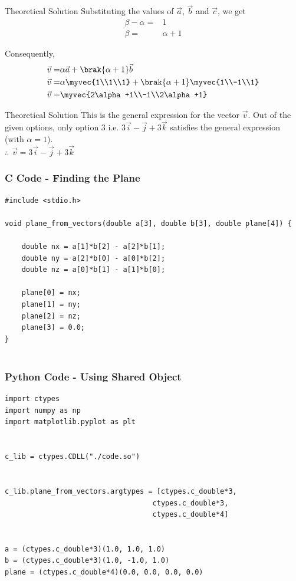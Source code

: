 \documentclass{beamer}
\begin{document}
\begin{frame}{Theoretical Solution}
Substituting the values of $\vec{a}$, $\vec{b}$ and $\vec{c}$, we get
\begin{align}
    \beta-\alpha =& 1\\
    \beta =& \alpha + 1
\end{align}

Consequently,
\begin{align}
    \vec{v} =& \alpha\vec{a} + \brak{\alpha + 1}\vec{b}\\
    \vec{v} =& \alpha\myvec{1\\1\\1} + \brak{\alpha + 1}\myvec{1\\-1\\1}\\
    \vec{v} =& \myvec{2\alpha+1\\-1\\2\alpha+1}
\end{align}

\end{frame}

\begin{frame}{Theoretical Solution}
This is the general expression for the vector $\vec{v}$. Out of the given options, only option 3 i.e. $3\vec{i}-\vec{j}+3\vec{k}$ satisfies the general expression (with $\alpha = 1$).\\

$\therefore$ $\vec{v} = 3\vec{i}-\vec{j}+3\vec{k}$
\end{frame}

\begin{frame}[fragile]
    \frametitle{C Code - Finding the Plane}

    \begin{lstlisting}
#include <stdio.h>

void plane_from_vectors(double a[3], double b[3], double plane[4]) {
    
    double nx = a[1]*b[2] - a[2]*b[1];
    double ny = a[2]*b[0] - a[0]*b[2];
    double nz = a[0]*b[1] - a[1]*b[0];

    plane[0] = nx;
    plane[1] = ny;
    plane[2] = nz;
    plane[3] = 0.0;
}


    \end{lstlisting}

\end{frame}

\begin{frame}[fragile]
    \frametitle{Python Code - Using Shared Object}
    \begin{lstlisting}
import ctypes
import numpy as np
import matplotlib.pyplot as plt


c_lib = ctypes.CDLL("./code.so")


c_lib.plane_from_vectors.argtypes = [ctypes.c_double*3,
                                   ctypes.c_double*3,
                                   ctypes.c_double*4]


a = (ctypes.c_double*3)(1.0, 1.0, 1.0) 
b = (ctypes.c_double*3)(1.0, -1.0, 1.0)
plane = (ctypes.c_double*4)(0.0, 0.0, 0.0, 0.0)


\end{lstlisting}
\end{frame}
\end{document}
